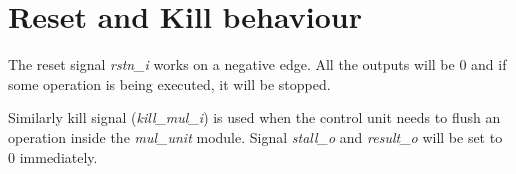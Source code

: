 \section{Reset and Kill behaviour}

The reset signal \textit{rstn\_i} works on a negative edge.
All the outputs will be 0 and if some operation is being executed, it will be stopped.

Similarly kill signal (\textit{kill\_mul\_i}) is used when the control unit needs to flush an operation inside the \textit{mul\_unit} module.  Signal \textit{stall\_o} and \textit{result\_o} will be set to 0 immediately.
